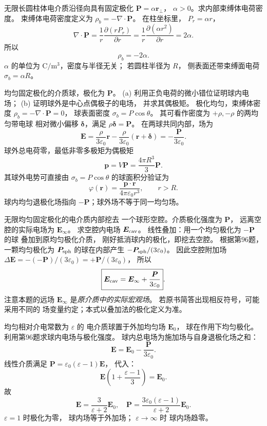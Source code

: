 无限长圆柱体电介质沿径向具有固定极化
$\bm P=\alpha\bm r_\perp$，
$\alpha>0$。求内部束缚体电荷密度。
\exsolution
束缚体电荷密度定义为
$\rho_b=-\nabla\cdot\bm P$。
在柱坐标里，
$P_r=\alpha r$，
\[
\nabla\cdot\bm P=
\frac1r\frac{\partial(rP_r)}{\partial r}
=\frac1r\frac{\partial(\alpha r^2)}{\partial r}
=2\alpha.
\]
所以
\[
\boxed{\rho_b=-2\alpha}.
\]
\excheck $\alpha$ 的单位为
$\mathrm{C/m^3}$，密度与半径无关；
若圆柱半径为 $R$，
侧表面还带束缚面电荷
$\sigma_b=\alpha R$。

均匀固定极化的介质球，极化为 $\bm P$。
(a) 利用正负电荷的微小错位证明球内电场；
(b) 证明球外是中心点偶极子的电场，
并求其偶极矩。
\exsolution
极化均匀，束缚体密度
$\rho_b=-\nabla\cdot\bm P=0$，
球表面密度 $\sigma_b=P\cos\theta$。
其可看作密度为 $+\rho,-\rho$ 的两均匀带电球
相对微小偏移 $\bm\delta$，满足
$\rho\bm\delta=\bm P$。
在两球共同内部，场为
\[
\bm E=
\frac{\rho}{3\varepsilon_0}\bm r
-\frac{\rho}{3\varepsilon_0}(\bm r+\bm\delta)
=\boxed{-\frac{\bm P}{3\varepsilon_0}}.
\]
球外总电荷零，最低非零多极矩为偶极矩
\[
\boxed{\bm p=V\bm P=
\frac{4\pi R^3}{3}\bm P}.
\]
其球外电势可直接由
$\sigma_b=P\cos\theta$ 的球面积分验证为
\[
\boxed{\varphi(\bm r)=
\frac{\bm p\cdot\bm r}
{4\pi\varepsilon_0r^3}},\qquad r>R.
\]
\excheck 球内均匀退极化场指向
$-\bm P$；球外场不等于同一均匀场。

无限均匀固定极化的电介质内部挖去
一个球形空腔。介质极化强度为 $\bm P$，
远离空腔的实际电场为 $\bm E_\infty$。
求空腔内电场 $\bm E_{\rm cav}$。
\exsolution
线性叠加：用一个均匀极化为 $-\bm P$ 的球
叠加到原均匀极化介质，
刚好抵消球内的极化，即挖去空腔。
根据第96题，一颗均匀极化为
$\bm P_{\rm sph}$ 的球在内部产生
$-\bm P_{\rm sph}/(3\varepsilon_0)$。
因此空腔附加场
$\Delta\bm E=-(-\bm P)/(3\varepsilon_0)
=+\bm P/(3\varepsilon_0)$，
所以
\[
\boxed{\bm E_{\rm cav}=
\bm E_\infty+\frac{\bm P}{3\varepsilon_0}}.
\]
\excheck 注意本题的远场 $\bm E_\infty$
是\emph{原介质中的实际宏观场}。
若原书简答出现相反符号，可能采用不同的
场变量约定；本式以叠加法的极化定义为准。

均匀相对介电常数为 $\varepsilon$ 的
电介质球置于外加均匀场 $\bm E_0$，
球在作用下均匀极化。
利用第96题求球内电场与极化强度。
\exsolution
球内总电场为施加场与自身退极化场之和：
\[
\bm E=\bm E_0-\frac{\bm P}{3\varepsilon_0}.
\]
线性介质满足
$\bm P=\varepsilon_0(\varepsilon-1)\bm E$，
代入：
\[
\bm E\left(1+\frac{\varepsilon-1}{3}\right)
=\bm E_0.
\]
故
\[
\boxed{\bm E=\frac3{\varepsilon+2}\bm E_0},
\quad
\boxed{\bm P=
\frac{3\varepsilon_0(\varepsilon-1)}
{\varepsilon+2}\bm E_0}.
\]
\excheck $\varepsilon=1$ 时极化为零，
球内场等于外加场；
$\varepsilon\to\infty$ 时
球内场趋零。

